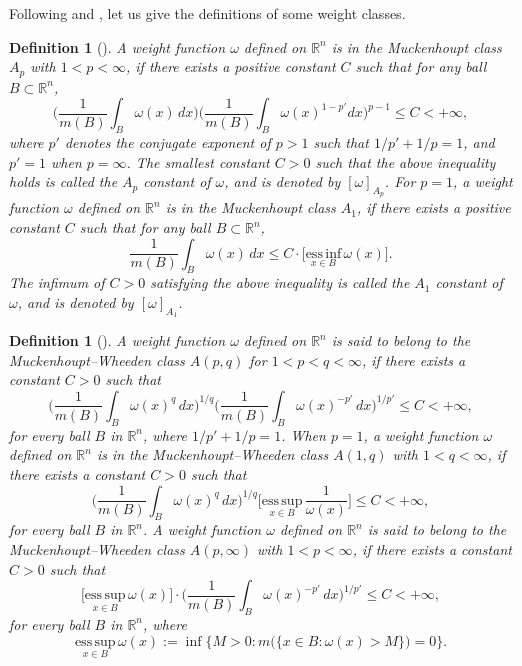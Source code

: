 \documentclass[preprint,10pt]{elsarticle}
\newtheorem{defin}[thm]{Definition}
\numberwithin{equation}{section}
\begin{document}
Following \cite{grafakos} and \cite{muckenhoupt2}, let us give the definitions of some weight classes.

\begin{defin}[\cite{grafakos}]
A weight function $\omega$ defined on $\mathbb R^n$ is in the Muckenhoupt class $A_p$ with $1<p<\infty$, if there exists a positive constant $C$ such that for any ball $B\subset\mathbb R^n$,
\begin{equation*}
\bigg(\frac{1}{m(B)}\int_{B}\omega(x)\,dx\bigg)\bigg(\frac{1}{m(B)}\int_{B}\omega(x)^{1-p'}dx\bigg)^{p-1}\leq C<+\infty,
\end{equation*}
where $p'$ denotes the conjugate exponent of $p>1$ such that $1/{p'}+1/p=1$, and $p'=1$ when $p=\infty$. The smallest constant $C>0$ such that the above inequality holds is called the $A_p$ constant of $\omega$, and is denoted by $[\omega]_{A_p}$. For $p=1$, a weight function $\omega$ defined on $\mathbb R^n$ is in the Muckenhoupt class $A_1$, if there exists a positive constant $C$ such that for any ball $B\subset\mathbb R^n$,
\begin{equation*}
\frac{1}{m(B)}\int_{B}\omega(x)\,dx\leq C\cdot\Big[\underset{x\in B}{\mathrm{ess\,inf}}\,\omega(x)\Big].
\end{equation*}
The infimum of $C>0$ satisfying the above inequality is called the $A_1$ constant of $\omega$, and is denoted by $[\omega]_{A_1}$.
\end{defin}

\begin{defin}[\cite{muckenhoupt2}]
A weight function $\omega$ defined on $\mathbb R^n$ is said to belong to the Muckenhoupt--Wheeden class $A(p,q)$ for $1<p<q<\infty$, if there exists a constant $C>0$ such that
\begin{equation*}
\bigg(\frac{1}{m(B)}\int_{B}\omega(x)^q\,dx\bigg)^{1/q}
\bigg(\frac{1}{m(B)}\int_{B}\omega(x)^{-p'}\,dx\bigg)^{1/{p'}}\leq C<+\infty,
\end{equation*}
for every ball $B$ in $\mathbb R^n$, where $1/{p'}+1/p=1$. When $p=1$, a weight function $\omega$ defined on $\mathbb R^n$ is in the Muckenhoupt--Wheeden class $A(1,q)$ with $1<q<\infty$, if there exists a constant $C>0$ such that
\begin{equation*}
\bigg(\frac{1}{m(B)}\int_{B}\omega(x)^q\,dx\bigg)^{1/q}
\bigg[\underset{x\in B}{\mathrm{ess\,sup}}\,\frac{1}{\omega(x)}\bigg]\leq C<+\infty,
\end{equation*}
for every ball $B$ in $\mathbb R^n$. A weight function $\omega$ defined on $\mathbb R^n$ is said to belong to the Muckenhoupt--Wheeden class $A(p,\infty)$ with $1<p<\infty$, if there exists a constant $C>0$ such that
\begin{equation*}
\Big[\underset{x\in{B}}{\mathrm{ess\,sup}}\,\omega(x)\Big]\cdot
\bigg(\frac{1}{m(B)}\int_{B}\omega(x)^{-p'}\,dx\bigg)^{1/{p'}}\leq C<+\infty,
\end{equation*}
for every ball $B$ in $\mathbb R^n$, where
\begin{equation*}
\underset{x\in B}{\mathrm{ess\,sup}}\,\omega(x):=\inf\big\{M>0:m\big(\big\{x\in B:\omega(x)>M\big\}\big)=0\big\}.
\end{equation*}
\end{defin}
\end{document}
